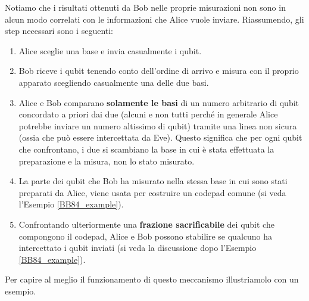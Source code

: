 \noindent Notiamo che i risultati ottenuti da Bob nelle proprie misurazioni non sono in alcun modo correlati con le informazioni che Alice vuole inviare. Riassumendo, gli step necessari sono i seguenti:
\begin{enumerate}
    \item Alice sceglie una base e invia casualmente i qubit.
    
    \item Bob riceve i qubit tenendo conto dell'ordine di arrivo e misura con il proprio apparato scegliendo casualmente una delle due basi. 
    
    \item Alice e Bob comparano \textbf{solamente le basi} di un numero arbitrario di qubit concordato a priori dai due (alcuni e non tutti perché in generale Alice potrebbe inviare un numero altissimo di qubit) tramite una linea non sicura (ossia che può essere intercettata da Eve). Questo significa che per ogni qubit che confrontano, i due si scambiano la base in cui è stata effettuata la preparazione e la misura, non lo stato misurato.
    
    \item La parte dei qubit  che Bob ha misurato nella stessa base in cui sono stati preparati da Alice,  viene usata per costruire un codepad comune (si veda  l'Esempio \ref{BB84_example}).
    
    \item Confrontando ulteriormente una \textbf{frazione sacrificabile} dei qubit che compongono il codepad, Alice e Bob possono  stabilire se qualcuno ha intercettato i qubit inviati (si veda la discussione dopo l'Esempio \ref{BB84_example}). 
\end{enumerate}

\noindent Per capire al meglio il funzionamento di questo meccanismo illustriamolo con un esempio.

